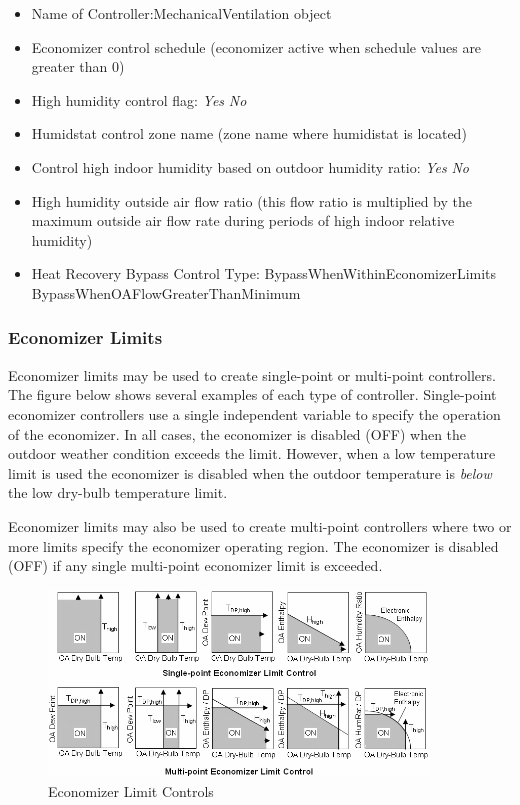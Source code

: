 \begin{itemize}
\item
  Name of Controller:MechanicalVentilation object
\item
  Economizer control schedule (economizer active when schedule values are greater than 0)
\item
  High humidity control flag: \emph{Yes} \textbar{} \emph{No}
\item
  Humidstat control zone name (zone name where humidistat is located)
\item
  Control high indoor humidity based on outdoor humidity ratio: \emph{Yes} \textbar{} \emph{No}
\item
  High humidity outside air flow ratio (this flow ratio is multiplied by the maximum outside air flow rate during periods of high indoor relative humidity)
\item
  Heat Recovery Bypass Control Type: BypassWhenWithinEconomizerLimits \textbar{} BypassWhenOAFlowGreaterThanMinimum
\end{itemize}

\subsubsection{Economizer Limits}\label{economizer-limits}

Economizer limits may be used to create single-point or multi-point controllers. The figure below shows several examples of each type of controller. Single-point economizer controllers use a single independent variable to specify the operation of the economizer. In all cases, the economizer is disabled (OFF) when the outdoor weather condition exceeds the limit. However, when a low temperature limit is used the economizer is disabled when the outdoor temperature is \emph{below} the low dry-bulb temperature limit.

Economizer limits may also be used to create multi-point controllers where two or more limits specify the economizer operating region. The economizer is disabled (OFF) if any single multi-point economizer limit is exceeded.

\begin{figure}[hbtp] %
\centering
\includegraphics[width=0.9\textwidth, height=0.9\textheight, keepaspectratio=true]{media/image4411.png}
\caption{Economizer Limit Controls \protect \label{fig:economizer-limit-controls}}
\end{figure}

